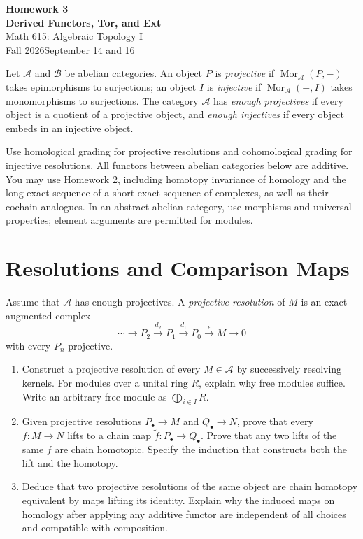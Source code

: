 \documentclass[11pt]{article}
\newcommand{\coursetitle}[3]{\begin{center}{\large\bfseries\color{teal}#1}\\[4pt]{\LARGE\bfseries\color{teal}#2}\\[6pt]Math 615: Algebraic Topology I\\Fall 2026\quad\textbar\quad #3\end{center}}
\newcommand{\Mor}{\operatorname{Mor}}\newcommand{\im}{\operatorname{im}}\newcommand{\coker}{\operatorname{coker}}\newcommand{\A}{\mathcal A}\newcommand{\Z}{\mathbb Z}\newcommand{\id}{\mathrm{id}}\DeclareMathOperator{\Cone}{Cone}\DeclareMathOperator{\Cyl}{Cyl}
\newcommand{\B}{\mathcal B}
\begin{document}
\coursetitle{Homework 3}{Derived Functors, Tor, and Ext}{September 14 and 16}
Let $\A$ and $\B$ be abelian categories. An object $P$ is \emph{projective} if
$\Mor_{\A}(P,-)$ takes epimorphisms to surjections; an object $I$ is
\emph{injective} if $\Mor_{\A}(-,I)$ takes monomorphisms to surjections.
The category $\A$ has \emph{enough projectives} if every object is a quotient
of a projective object, and \emph{enough injectives} if every object embeds
in an injective object.

Use homological grading for projective resolutions and cohomological grading
for injective resolutions. All functors between abelian categories below are
additive. You may use Homework 2, including homotopy invariance of homology and
the long exact sequence of a short exact sequence of complexes, as well as
their cochain analogues. In an abstract abelian category, use morphisms and
universal properties; element arguments are permitted for modules.

\section{Resolutions and Comparison Maps}\label{ex:comparison}
Assume that $\A$ has enough projectives. A \emph{projective resolution} of $M$
is an exact augmented complex
\[
\cdots\longrightarrow P_2\xrightarrow{d_2}P_1\xrightarrow{d_1}P_0
\xrightarrow{\epsilon}M\longrightarrow0
\]
with every $P_n$ projective.
\begin{enumerate}
\item Construct a projective resolution of every $M\in\A$ by successively
resolving kernels. For modules over a unital ring $R$, explain why free
modules suffice. Write an arbitrary free module as $\bigoplus_{i\in I}R$.
\item Given projective resolutions $P_\bullet\to M$ and $Q_\bullet\to N$,
prove that every $f:M\to N$ lifts to a chain map $\widetilde f:P_\bullet\to
Q_\bullet$. Prove that any two lifts of the same $f$ are chain homotopic.
Specify the induction that constructs both the lift and the homotopy.
\item Deduce that two projective resolutions of the same object are chain
homotopy equivalent by maps lifting its identity. Explain why the induced
maps on homology after applying any additive functor are independent of all
choices and compatible with composition.
\end{enumerate}
\end{document}
